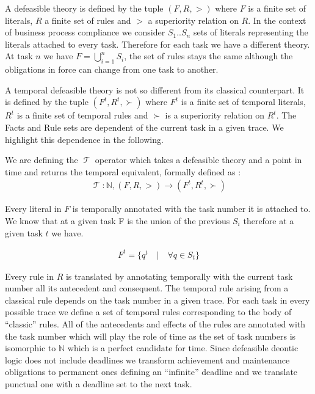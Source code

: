 \documentclass[10pt]{report}
\DeclareMathOperator{\tempop}{\mathscr{T}}
\begin{document}
A defeasible theory is defined by the tuple $(F, R, >)$ where $F$ is a finite set of literals, $R$ a finite set of rules and $>$ a superiority relation on $R$. In the context of business process compliance we consider $S_{1}..S_{n}$ sets of literals representing the literals attached to every task. Therefore for each task we have a different theory. At task $n$ we have $F = \bigcup \limits _{i=1}^n S_{i}$, the set of rules stays the same although the obligations in force can change from one task to another.

A temporal defeasible theory is not so different from its classical counterpart. It is defined by the tuple $(F^{t}, R^{t}, \succ)$ where $F^{t}$ is a finite set of temporal literals, $R^{t}$ is a finite set of temporal rules and $\succ$ is a superiority relation on $R^{t}$. The Facts and Rule sets are dependent of the current task in a given trace. We highlight this dependence in the following.

We are defining the $\tempop$ operator which takes a defeasible theory and a point in time and returns the temporal equivalent, formally defined as : 
\begin{gather}
\tempop : \mathbb{N}, (F, R, >) \rightarrow (F^{t}, R^{t}, \succ)
\end{gather}

Every literal in $F$ is temporally annotated with the task number it is attached to. We know that at a given task F is the union of the previous $S_{i}$ therefore at a given task $t$ we have. 

\begin{gather}
F^{t} = \{q^{t} \quad | \quad \forall q \in S_{t} \}
\end{gather}

Every rule in $R$ is translated by annotating temporally with the current task number all its antecedent and consequent. The temporal rule arising from a classical rule depends on the task number in a given trace. For each task in every possible trace we define a set of temporal rules corresponding to the body of \enquote{classic} rules. All of the antecedents and effects of the rules are annotated with the task number which will play the role of time as the set of task numbers is isomorphic to $\mathbb{N}$ which is a perfect candidate for time. Since defeasible deontic logic does not include deadlines we transform achievement and maintenance obligations to permanent ones defining an \enquote{infinite} deadline and we translate punctual one with a deadline set to the next task.
\end{document}
